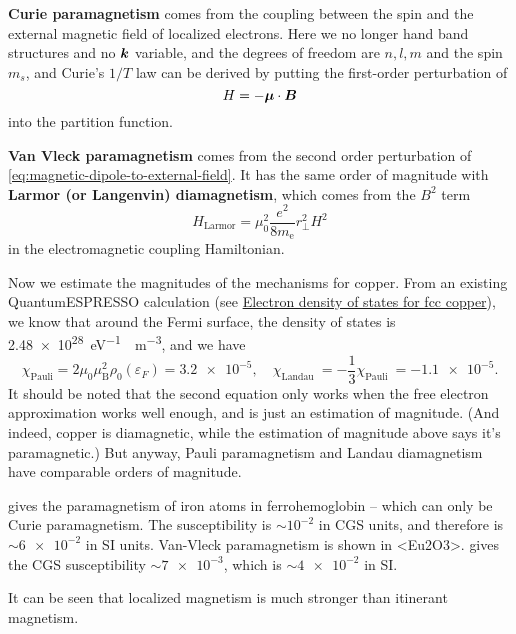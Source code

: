 \documentclass[hyperref, a4paper]{article}
\newcommand*{\concept}[1]{{\textbf{#1}}}
\def\ce#1{<#1>}%
\begin{document}
\concept{Curie paramagnetism} comes from the coupling 
between the spin and the external magnetic field 
of localized electrons.
Here we no longer hand band structures and no $\vb*{k}$ variable, 
and the degrees of freedom are $n, l, m$ and the spin $m_s$,
and Curie's $1 / T$ law can be derived by putting the first-order perturbation of
\begin{equation}
    H = - \vb*{\mu} \cdot \vb*{B} 
    \label{eq:magnetic-dipole-to-external-field}
\end{equation}
into the partition function.

\concept{Van Vleck paramagnetism} comes from 
the second order perturbation of \eqref{eq:magnetic-dipole-to-external-field}.
It has the same order of magnitude with 
\concept{Larmor (or Langenvin) diamagnetism},
which comes from the $B^2$ term 
\begin{equation}
    H_{\text{Larmor}} = \mu_0^2 \frac{e^2}{8 m_{\mathrm{e}}} r_{\perp}^2 H^2
\end{equation}
in the electromagnetic coupling Hamiltonian.

Now we estimate the magnitudes of the mechanisms for copper.
From an existing QuantumESPRESSO calculation 
(see \href{http://lampx.tugraz.at/~hadley/ss1/materials/dos/fccCu_dos.html}{Electron density of states for fcc copper}),
we know that around the Fermi surface, 
the density of states is \SI{2.48e28}{eV^{-1} \cdot m^{-3}},
and we have 
\begin{equation}
    \chi_{\text {Pauli}}=2 \mu_0 \mu_{\mathrm{B}}^2 \rho_0\left(\varepsilon_F\right)
    = \num{3.2e-5} , \quad 
    \chi_{\text {Landau }}=-\frac{1}{3} \chi_{\text {Pauli }} = \num{-1.1e-5}.
\end{equation}
It should be noted that the second equation only works 
when the free electron approximation works well enough, 
and is just an estimation of magnitude. 
(And indeed, copper is diamagnetic,
while the estimation of magnitude above 
says it's paramagnetic.)
But anyway, Pauli paramagnetism 
and Landau diamagnetism 
have comparable orders of magnitude.

\cite{taylor1938magnetic} gives the paramagnetism of iron atoms in ferrohemoglobin
-- which can only be Curie paramagnetism.
The susceptibility is $\sim 10^{-2}$ in CGS units,
and therefore is $\sim \num{6e-2}$ in SI units.
Van-Vleck paramagnetism is shown in \ce{Eu2O3}. 
\cite{eu2o3} gives the CGS susceptibility $\sim \num{7e-3}$, 
which is $\sim \num{4e-2}$ in SI. 

It can be seen that localized magnetism is much stronger than itinerant magnetism.
\end{document}
